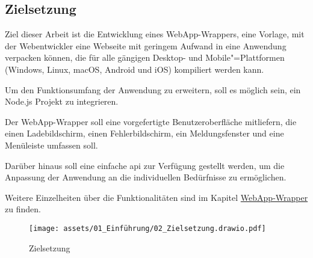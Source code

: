 \subsection{Zielsetzung}

Ziel dieser Arbeit ist die Entwicklung eines WebApp-Wrappers, eine Vorlage, mit der Webentwickler eine Webseite mit geringem Aufwand in eine Anwendung verpacken können, die für alle gängigen Desktop- und Mobile"=Plattformen (Windows, Linux, macOS, Android und iOS) kompiliert werden kann.

Um den Funktionsumfang der Anwendung zu erweitern, soll es möglich sein, ein Node.js Projekt zu integrieren.

Der WebApp-Wrapper soll eine vorgefertigte Benutzeroberfläche mitliefern, die einen Ladebildschirm, einen Fehlerbildschirm, ein Meldungsfenster und eine Menüleiste umfassen soll.

Darüber hinaus soll eine einfache \ac{api} zur Verfügung gestellt werden, um die Anpassung der Anwendung an die individuellen Bedürfnisse zu ermöglichen.

Weitere Einzelheiten über die Funktionalitäten sind im Kapitel \hyperref[sec:WebApp-Wrapper]{WebApp-Wrapper} zu finden.

\begin{figure}[H]
  \centering
  \texttt{[image: assets/01\_Einführung/02\_Zielsetzung.drawio.pdf]}
  \caption[Zielsetzung]{Zielsetzung}
\end{figure}
